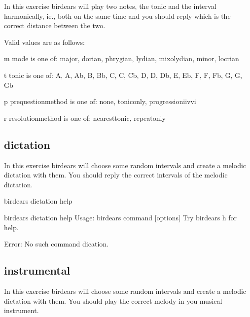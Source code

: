 \documentclass[letterpaper,10pt,english]{sphinxmanual}
\begin{document}
\begin{sphinxVerbatim}[commandchars=\\\{\}]
  In this exercise birdears will play two notes, the tonic and the interval
  harmonically, ie., both on the same time and you should reply which is the
  correct distance between the two.

  Valid values are as follows:

  \PYGZhy{}m \PYGZlt{}mode\PYGZgt{} is one of: major, dorian, phrygian, lydian, mixolydian, minor,
  locrian

  \PYGZhy{}t \PYGZlt{}tonic\PYGZgt{} is one of: A, A\PYGZsh{}, Ab, B, Bb, C, C\PYGZsh{}, Cb, D, D\PYGZsh{}, Db, E, Eb, F,
  F\PYGZsh{}, Fb, G, G\PYGZsh{}, Gb

  \PYGZhy{}p \PYGZlt{}prequestion\PYGZus{}method\PYGZgt{} is one of: none, tonic\PYGZus{}only, progression\PYGZus{}i\PYGZus{}iv\PYGZus{}v\PYGZus{}i

  \PYGZhy{}r \PYGZlt{}resolution\PYGZus{}method\PYGZgt{} is one of: nearest\PYGZus{}tonic, repeat\PYGZus{}only
\end{sphinxVerbatim}


\subsection{dictation}
\label{\detokenize{using:dictation}}
In this exercise birdears will choose some random intervals and create a
melodic dictation with them. You should reply the correct intervals of the
melodic dictation.

\begin{sphinxVerbatim}[commandchars=\\\{\}]
birdears dictation \PYGZhy{}\PYGZhy{}help
\end{sphinxVerbatim}

\begin{sphinxVerbatim}[commandchars=\\\{\}]
\PYGZdl{} birdears dictation \PYGZhy{}\PYGZhy{}help
Usage: birdears  \PYGZlt{}command\PYGZgt{} [options]
Try \PYGZdq{}birdears \PYGZhy{}h\PYGZdq{} for help.

Error: No such command \PYGZdq{}dication\PYGZdq{}.
\end{sphinxVerbatim}


\subsection{instrumental}
\label{\detokenize{using:instrumental}}
In this exercise birdears will choose some random intervals and create a
melodic dictation with them. You should play the correct melody in you
musical instrument.
\end{document}
